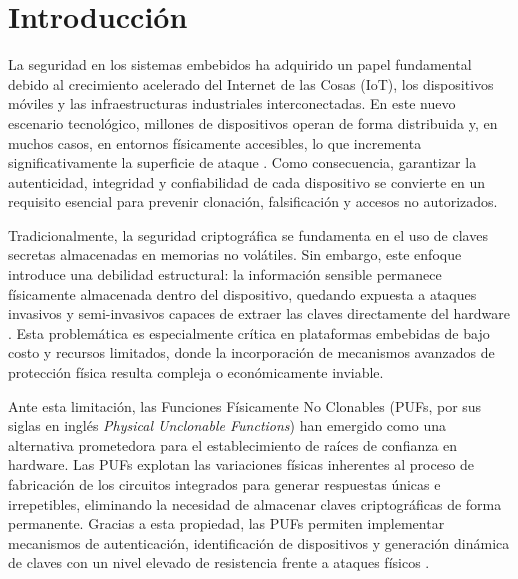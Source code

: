 
\chapter{Introducción}
\label{chp:intro}

La seguridad en los sistemas embebidos ha adquirido un papel
fundamental debido al crecimiento acelerado del Internet de las Cosas (IoT), los
dispositivos móviles y las infraestructuras industriales interconectadas. En este nuevo
escenario tecnológico, millones de dispositivos operan de forma distribuida y, en muchos
casos, en entornos físicamente accesibles, lo que incrementa significativamente la
superficie de ataque \cite{shamsoshoara_2020_puf}. Como consecuencia, garantizar la autenticidad, integridad y
confiabilidad de cada dispositivo se convierte en un requisito esencial para prevenir
clonación, falsificación y accesos no autorizados.

Tradicionalmente, la seguridad criptográfica se fundamenta en el uso de claves secretas
almacenadas en memorias no volátiles. Sin embargo, este enfoque introduce una debilidad
estructural: la información sensible permanece físicamente almacenada dentro del
dispositivo, quedando expuesta a ataques invasivos y semi-invasivos capaces de extraer
las claves directamente del hardware \cite{hou_2019_lightweight}. Esta problemática es
especialmente crítica en plataformas embebidas de bajo costo y recursos limitados, donde
la incorporación de mecanismos avanzados de protección física resulta compleja o
económicamente inviable.

Ante esta limitación, las Funciones Físicamente No Clonables (PUFs, por sus siglas en inglés
\textit{Physical Unclonable Functions}) han emergido como una alternativa prometedora
para el establecimiento de raíces de confianza en hardware. Las PUFs explotan las
variaciones físicas inherentes al proceso de fabricación de los
circuitos integrados para generar respuestas únicas e irrepetibles, eliminando la
necesidad de almacenar claves criptográficas de forma permanente. Gracias a esta
propiedad, las PUFs permiten implementar mecanismos de autenticación, identificación de
dispositivos y generación dinámica de claves con un nivel elevado de resistencia frente
a ataques físicos \cite{shamsoshoara_2020_puf, handschuh_2011_hardware}.

